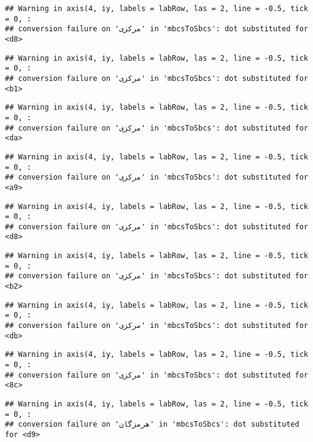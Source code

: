 \documentclass[
]{article}
\begin{document}
\begin{verbatim}
## Warning in axis(4, iy, labels = labRow, las = 2, line = -0.5, tick = 0, :
## conversion failure on 'مرکزی' in 'mbcsToSbcs': dot substituted for <d8>
\end{verbatim}

\begin{verbatim}
## Warning in axis(4, iy, labels = labRow, las = 2, line = -0.5, tick = 0, :
## conversion failure on 'مرکزی' in 'mbcsToSbcs': dot substituted for <b1>
\end{verbatim}

\begin{verbatim}
## Warning in axis(4, iy, labels = labRow, las = 2, line = -0.5, tick = 0, :
## conversion failure on 'مرکزی' in 'mbcsToSbcs': dot substituted for <da>
\end{verbatim}

\begin{verbatim}
## Warning in axis(4, iy, labels = labRow, las = 2, line = -0.5, tick = 0, :
## conversion failure on 'مرکزی' in 'mbcsToSbcs': dot substituted for <a9>
\end{verbatim}

\begin{verbatim}
## Warning in axis(4, iy, labels = labRow, las = 2, line = -0.5, tick = 0, :
## conversion failure on 'مرکزی' in 'mbcsToSbcs': dot substituted for <d8>
\end{verbatim}

\begin{verbatim}
## Warning in axis(4, iy, labels = labRow, las = 2, line = -0.5, tick = 0, :
## conversion failure on 'مرکزی' in 'mbcsToSbcs': dot substituted for <b2>
\end{verbatim}

\begin{verbatim}
## Warning in axis(4, iy, labels = labRow, las = 2, line = -0.5, tick = 0, :
## conversion failure on 'مرکزی' in 'mbcsToSbcs': dot substituted for <db>
\end{verbatim}

\begin{verbatim}
## Warning in axis(4, iy, labels = labRow, las = 2, line = -0.5, tick = 0, :
## conversion failure on 'مرکزی' in 'mbcsToSbcs': dot substituted for <8c>
\end{verbatim}

\begin{verbatim}
## Warning in axis(4, iy, labels = labRow, las = 2, line = -0.5, tick = 0, :
## conversion failure on 'هرمزگان' in 'mbcsToSbcs': dot substituted for <d9>
\end{verbatim}
\end{document}
